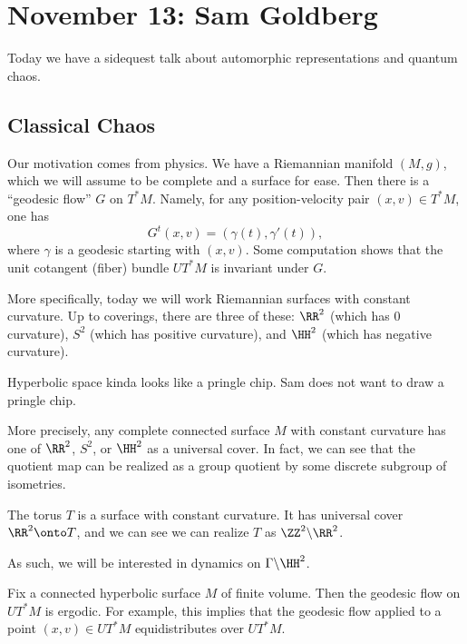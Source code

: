 \documentclass{article}
\begin{document}
\section{November 13: Sam Goldberg}
Today we have a sidequest talk about automorphic representations and quantum chaos.

\subsection{Classical Chaos}
Our motivation comes from physics. We have a Riemannian manifold $(M,g)$, which we will assume to be complete and a surface for ease. Then there is a ``geodesic flow'' $G$ on $T^*M$. Namely, for any position-velocity pair $(x,v)\in T^*M$, one has
\[G^t(x,v)=(\gamma(t),\gamma'(t)),\]
where $\gamma$ is a geodesic starting with $(x,v)$. Some computation shows that the unit cotangent (fiber) bundle $UT^*M$ is invariant under $G$.

More specifically, today we will work Riemannian surfaces with constant curvature. Up to coverings, there are three of these: $\RR^2$ (which has $0$ curvature), $S^2$ (which has positive curvature), and $\HH^2$ (which has negative curvature). 
\begin{remark}
	Hyperbolic space kinda looks like a pringle chip. Sam does not want to draw a pringle chip.
\end{remark}
More precisely, any complete connected surface $M$ with constant curvature has one of $\RR^2$, $S^2$, or $\HH^2$ as a universal cover. In fact, we can see that the quotient map can be realized as a group quotient by some discrete subgroup of isometries.
\begin{example}
	The torus $T$ is a surface with constant curvature. It has universal cover $\RR^2\onto T$, and we can see we can realize $T$ as $\ZZ^2\backslash\RR^2$.
\end{example}
As such, we will be interested in dynamics on $\Gamma\backslash\HH^2$.
\begin{theorem} \label{thm:classical-chaos}
	Fix a connected hyperbolic surface $M$ of finite volume. Then the geodesic flow on $UT^*M$ is ergodic. For example, this implies that the geodesic flow applied to a point $(x,v)\in UT^*M$ equidistributes over $UT^*M$.
\end{theorem}
\end{document}
